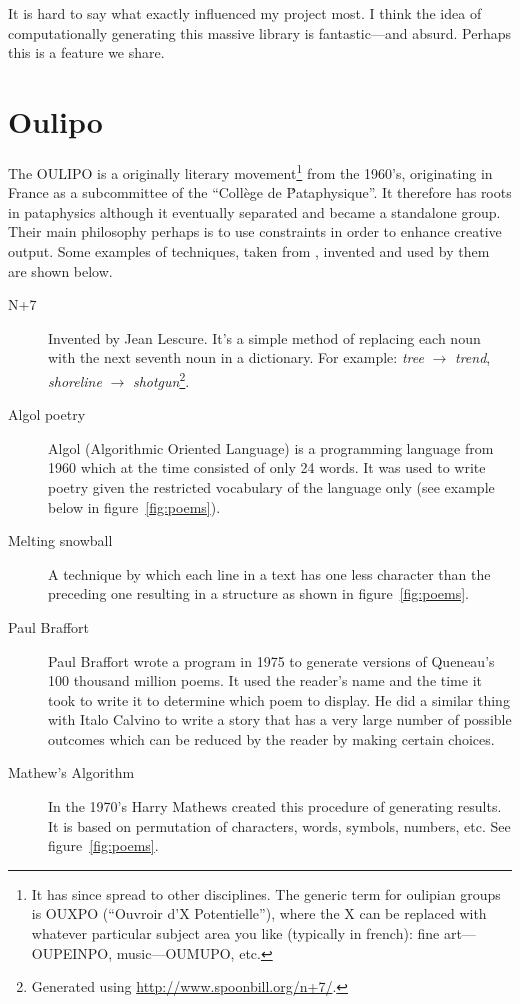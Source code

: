 It is hard to say what exactly influenced my project most. I think the idea of computationally generating this massive library is fantastic---and absurd. Perhaps this is a feature we share.


\section{Oulipo}
\label{s:oulipo}


The \ac{OULIPO} is a originally literary movement\footnote{It has since spread to other disciplines. The generic term for oulipian groups is OUXPO (``Ouvroir d'X Potentielle''), where the X can be replaced with whatever particular subject area you like (typically in french): fine art---OUPEINPO, music---OUMUPO, etc.} from the 1960's, originating in France as a subcommittee of the ``Coll\`{e}ge de \'Pataphysique''. It therefore has roots in pataphysics although it eventually separated and became a standalone group. Their main philosophy perhaps is to use constraints in order to enhance creative output. Some examples of techniques, taken from \autocite{Mathews2005}, invented and used by them are shown below.

\begin{description}
  \item[N+7] Invented by Jean Lescure. It's a simple method of replacing each noun with the next seventh noun in a dictionary. For example: \textit{tree} $\rightarrow$ \textit{trend}, \textit{shoreline} $\rightarrow$ \textit{shotgun}\footnote{Generated using \url{http://www.spoonbill.org/n+7/}.}.
  \item[Algol poetry] Algol (Algorithmic Oriented Language) is a programming language from 1960 which at the time consisted of only \num{24} words. It was used to write poetry given the restricted vocabulary of the language only (see example below in figure~\ref{fig:poems}).
  \item[Melting snowball] A technique by which each line in a text has one less character than the preceding one resulting in a structure as shown in figure~\ref{fig:poems}.
  \item[Paul Braffort] Paul Braffort wrote a program in 1975 to generate versions of Queneau's \num{100} thousand million poems. It used the reader's name and the time it took to write it to determine which poem to display. He did a similar thing with Italo Calvino to write a story that has a very large number of possible outcomes which can be reduced by the reader by making certain choices.
  \item[Mathew's Algorithm] In the 1970's Harry Mathews created this procedure of generating results. It is based on permutation of characters, words, symbols, numbers, etc. See figure~\ref{fig:poems}.
\end{description}

